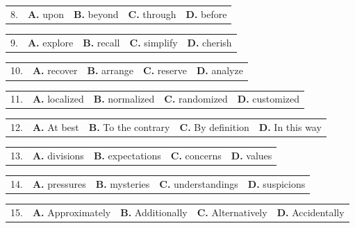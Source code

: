 \documentclass[UTF8,11pt]{ctexart}
\begin{document}
\noindent\begin{tabularx}{\linewidth}{@{}lXXXX@{}}8. & \textbf{A.} upon & \textbf{B.} beyond & \textbf{C.} through & \textbf{D.} before\\\end{tabularx}\par

\noindent\begin{tabularx}{\linewidth}{@{}lXXXX@{}}9. & \textbf{A.} explore & \textbf{B.} recall & \textbf{C.} simplify & \textbf{D.} cherish\\\end{tabularx}\par

\noindent\begin{tabularx}{\linewidth}{@{}lXXXX@{}}10. & \textbf{A.} recover & \textbf{B.} arrange & \textbf{C.} reserve & \textbf{D.} analyze\\\end{tabularx}\par

\noindent\begin{tabularx}{\linewidth}{@{}lXXXX@{}}11. & \textbf{A.} localized & \textbf{B.} normalized & \textbf{C.} randomized & \textbf{D.} customized\\\end{tabularx}\par

\noindent\begin{tabularx}{\linewidth}{@{}lXXXX@{}}12. & \textbf{A.} At best & \textbf{B.} To the contrary & \textbf{C.} By definition & \textbf{D.} In this way\\\end{tabularx}\par

\noindent\begin{tabularx}{\linewidth}{@{}lXXXX@{}}13. & \textbf{A.} divisions & \textbf{B.} expectations & \textbf{C.} concerns & \textbf{D.} values\\\end{tabularx}\par

\noindent\begin{tabularx}{\linewidth}{@{}lXXXX@{}}14. & \textbf{A.} pressures & \textbf{B.} mysteries & \textbf{C.} understandings & \textbf{D.} suspicions\\\end{tabularx}\par

\noindent\begin{tabularx}{\linewidth}{@{}lXXXX@{}}15. & \textbf{A.} Approximately & \textbf{B.} Additionally & \textbf{C.} Alternatively & \textbf{D.} Accidentally\\\end{tabularx}\par
\end{document}
